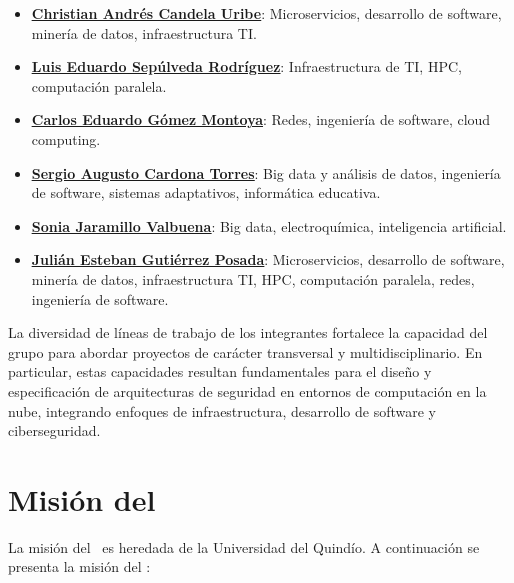 \begin{itemize}
	\item \href{https://scienti.minciencias.gov.co/cvlac/visualizador/generarCurriculoCv.do?cod_rh=0000210897}{\underline{{\textbf{Christian Andrés Candela Uribe}}}}: Microservicios, desarrollo de software, minería de datos, infraestructura TI.\@
	\item \href{https://scienti.minciencias.gov.co/cvlac/visualizador/generarCurriculoCv.do?cod_rh=0001383939}{\underline{{\textbf{Luis Eduardo Sepúlveda Rodríguez}}}}: Infraestructura de TI, HPC, computación paralela.
	\item \href{https://scienti.minciencias.gov.co/cvlac/visualizador/generarCurriculoCv.do?cod_rh=0001343801}{\underline{{\textbf{Carlos Eduardo Gómez Montoya}}}}: Redes, ingeniería de software, cloud computing.
	\item \href{https://scienti.minciencias.gov.co/cvlac/visualizador/generarCurriculoCv.do?cod_rh=0001398775}{\underline{{\textbf{Sergio Augusto Cardona Torres}}}}: Big data y análisis de datos, ingeniería de software, sistemas adaptativos, informática educativa.
	\item \href{https://scienti.minciencias.gov.co/cvlac/visualizador/generarCurriculoCv.do?cod_rh=0000193550}{\underline{{\textbf{Sonia Jaramillo Valbuena}}}}: Big data, electroquímica, inteligencia artificial.
	\item \href{https://scienti.minciencias.gov.co/cvlac/visualizador/generarCurriculoCv.do?cod_rh=0000283495}{\underline{{\textbf{Julián Esteban Gutiérrez Posada}}}}: Microservicios, desarrollo de software, minería de datos, infraestructura TI, HPC, computación paralela, redes, ingeniería de software.
\end{itemize}

La diversidad de líneas de trabajo de los integrantes fortalece la capacidad del grupo para abordar proyectos de carácter transversal y 
multidisciplinario. En particular, estas capacidades resultan fundamentales para el diseño y especificación de arquitecturas de 
seguridad en entornos de computación en la nube, integrando enfoques de infraestructura, desarrollo de software y ciberseguridad.

\section{Misión del \GRID}

La misión del \GRID\ es heredada de la Universidad del Quindío. A continuación se presenta la misión del \GRID:\@

